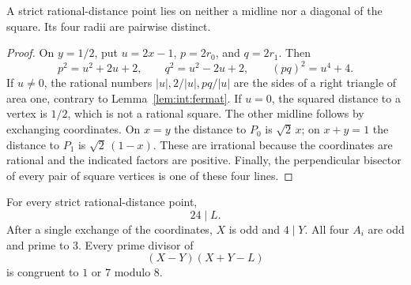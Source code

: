\begin{lemma}\label{lem:int:symmetry}
A strict rational-distance point lies on neither a midline nor a
diagonal of the square. Its four radii are pairwise distinct.
\end{lemma}

\begin{proof}
On $y=1/2$, put $u=2x-1$, $p=2r_0$, and $q=2r_1$. Then
\[
 p^2=u^2+2u+2,\qquad q^2=u^2-2u+2,
 \qquad (pq)^2=u^4+4.
\]
If $u\ne0$, the rational numbers $|u|,2/|u|,pq/|u|$ are the sides
of a right triangle of area one, contrary to
Lemma~\ref{lem:int:fermat}. If $u=0$, the squared distance to a vertex
is $1/2$, which is not a rational square. The other midline follows
by exchanging coordinates. On $x=y$ the distance to $P_0$ is
$\sqrt2\,x$; on $x+y=1$ the distance to $P_1$ is
$\sqrt2\,(1-x)$. These are irrational because the coordinates are
rational and the indicated factors are positive. Finally, the
perpendicular bisector of every pair of square vertices is one of
these four lines.
\end{proof}

\begin{proposition}\label{int:primitive}
For every strict rational-distance point,
\[
 24\mid L.
\]
After a single exchange of the coordinates, $X$ is odd and $4\mid Y$.
All four $A_i$ are odd and prime to $3$. Every prime divisor of
\begin{equation}\label{eq:int:diagonal-product}
 (X-Y)(X+Y-L)
\end{equation}
is congruent to $1$ or $7$ modulo $8$.
\end{proposition}

